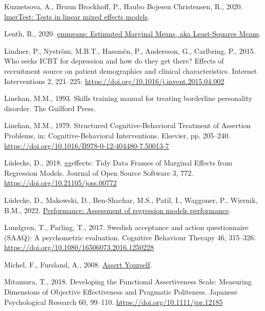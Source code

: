 \documentclass[preprint,
3p]{elsarticle} %
\newlength{\cslhangindent}
\newlength{\cslentryspacingunit} %
\newenvironment{CSLReferences}[2] %
 {%
  \setlength{\parindent}{0pt}
  \ifodd #1
  \let\oldpar\par
  \def\par{\hangindent=\cslhangindent\oldpar}
  \fi
  \setlength{\parskip}{#2\cslentryspacingunit}
 }%
 {}
\begin{document}
\begin{CSLReferences}{1}{0}
\leavevmode{}%
Kuznetsova, A., Bruun Brockhoff, P., Haubo Bojesen Christensen, R.,
2020. \href{https://github.com/runehaubo/lmerTestR}{lmerTest: Tests in
linear mixed effects models}.

\leavevmode{}%
Lenth, R., 2020.
\href{https://cran.r-project.org/package=emmeans}{{emmeans: Estimated
Marginal Means, aka Least-Squares Means}}.

\leavevmode{}%
Lindner, P., Nyström, M.B.T., Hassmén, P., Andersson, G., Carlbring, P.,
2015. Who seeks ICBT for depression and how do they get there? Effects
of recruitment source on patient demographics and clinical
characteristics. Internet Interventions 2, 221--225.
\url{https://doi.org/10.1016/j.invent.2015.04.002}

\leavevmode{}%
Linehan, M.M., 1993. Skills training manual for treating borderline
personality disorder. The Guilford Press.

\leavevmode{}%
Linehan, M.M., 1979. {Structured Cognitive-Behavioral Treatment of
Assertion Problems}, in: Cognitive-Behavioral Interventions. Elsevier,
pp. 205--240. \url{https://doi.org/10.1016/B978-0-12-404480-7.50013-7}

\leavevmode{}%
Lüdecke, D., 2018. {ggeffects: Tidy Data Frames of Marginal Effects from
Regression Models}. Journal of Open Source Software 3, 772.
\url{https://doi.org/10.21105/joss.00772}

\leavevmode{}%
Lüdecke, D., Makowski, D., Ben-Shachar, M.S., Patil, I., Waggoner, P.,
Wiernik, B.M., 2022.
\href{https://easystats.github.io/performance/}{Performance: Assessment
of regression models performance}.

\leavevmode{}%
Lundgren, T., Parling, T., 2017. Swedish acceptance and action
questionnaire (SAAQ): A psychometric evaluation. Cognitive Behaviour
Therapy 46, 315--326.
\url{https://doi.org/10.1080/16506073.2016.1250228}

\leavevmode{}%
Michel, F., Fursland, A., 2008.
\href{https://www.cci.health.wa.gov.au/Resources/Looking-After-Yourself/Assertiveness}{{Assert
Yourself}}.

\leavevmode{}%
Mitamura, T., 2018. {Developing the Functional Assertiveness Scale:
Measuring Dimensions of Objective Effectiveness and Pragmatic
Politeness}. Japanese Psychological Research 60, 99--110.
\url{https://doi.org/10.1111/jpr.12185}


\end{CSLReferences}
\end{document}
